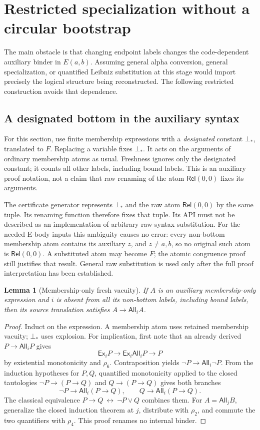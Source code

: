 \documentclass[11pt,letterpaper]{article}
\newtheorem{lemma}[theorem]{Lemma}
\theoremstyle{definition}\newtheorem{definition}[theorem]{Definition}
\theoremstyle{remark}\newtheorem{remark}[theorem]{Remark}
\newcommand{\Rel}{\mathsf{Rel}}
\newcommand{\All}{\mathsf{All}}
\newcommand{\Ex}{\mathsf{Ex}}
\newcommand{\To}{\rightarrow}
\begin{document}
\section{Restricted specialization without a circular bootstrap}\label{sec:bootstrap}
The main obstacle is that changing endpoint labels changes the code-dependent auxiliary binder in $E(a,b)$. Assuming general alpha conversion, general specialization, or quantified Leibniz substitution at this stage would import precisely the logical structure being reconstructed. The following restricted construction avoids that dependence.

\subsection{A designated bottom in the auxiliary syntax}
For this section, use finite membership expressions with a \emph{designated} constant $\bot_*$, translated to $F$. Replacing a variable fixes $\bot_*$. It acts on the arguments of ordinary membership atoms as usual. Freshness ignores only the designated constant; it counts all other labels, including bound labels. This is an auxiliary proof notation, not a claim that raw renaming of the atom $\Rel(0,0)$ fixes its arguments.

The certificate generator represents $\bot_*$ and the raw atom $\Rel(0,0)$ by the same tuple. Its renaming function therefore fixes that tuple. Its API must not be described as an implementation of arbitrary raw-syntax substitution. For the needed E-body inputs this ambiguity causes no error: every non-bottom membership atom contains its auxiliary $z$, and $z\ne a,b$, so no original such atom is $\Rel(0,0)$. A substituted atom may become $F$; the atomic congruence proof still justifies that result. General raw substitution is used only after the full proof interpretation has been established.

\begin{lemma}[Membership-only fresh vacuity]\label{lem:vac}
If $A$ is an auxiliary membership-only expression and $i$ is absent from all its non-bottom labels, including bound labels, then its source translation satisfies $A\To\All_i A$.
\end{lemma}
\begin{proof}
Induct on the expression. A membership atom uses retained membership vacuity; $\bot_*$ uses explosion. For implication, first note that an already derived $P\To\All_iP$ gives
\[
 \Ex_i P\To\Ex_i\All_iP\To P
\]
by existential monotonicity and $\rho_6$. Contraposition yields $\neg P\To\All_i\neg P$. From the induction hypotheses for $P,Q$, quantified monotonicity applied to the closed tautologies
$\neg P\To(P\To Q)$ and $Q\To(P\To Q)$ gives both branches
\[
 \neg P\To\All_i(P\To Q),\qquad
 Q\To\All_i(P\To Q).
\]
The classical equivalence $P\To Q\ \leftrightarrow\ \neg P\lor Q$ combines them. For $A=\All_jB$, generalize the closed induction theorem at $j$, distribute with $\rho_2$, and commute the two quantifiers with $\rho_4$. This proof renames no internal binder.
\end{proof}
\end{document}
